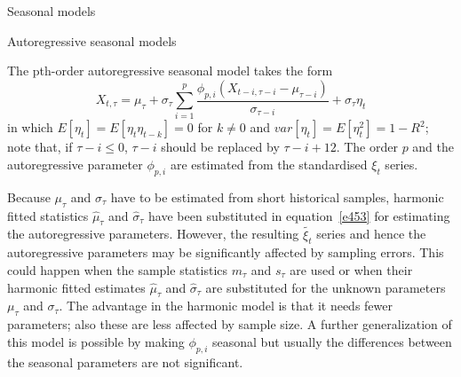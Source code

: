 \documentclass[8pt]{beamer}
\renewcommand{\emph}[1]{\textcolor{myorange}{#1}}
\begin{document}
\begin{frame}{Seasonal models}
    \begin{block}{Autoregressive seasonal models}
    \end{block}
    The pth-order autoregressive seasonal model takes the form
\begin{equation}
    X_{t,\tau} = \mu_{\tau} + \sigma_{\tau} \sum_{i=1}^p \frac{\phi_{p,i} (X_{t-i,\tau-i} - \mu_{\tau-i})}{\sigma_{\tau-i}} + \sigma_{\tau} \eta_t
        \label{e453}
    \end{equation}
    in which $E[\eta_t] = E[\eta_t \eta_{t-k}] = 0$ for $k\neq0$ and $var[\eta_t] = E[\eta_t^2] = 1-R^2$; note that, if $\tau -i \leq 0$, $\tau-i$ should be replaced by $\tau-i +12$. The order $p$ and the \emph{autoregressive parameter} $\phi_{p,i}$ are estimated from the standardised $\xi_t$ series. 

    Because $\mu_{\tau}$ and $\sigma_{\tau}$ have to be estimated from short historical samples, \emph{harmonic fitted statistics} $\hat{\mu}_{\tau}$ and $\hat{\sigma}_{\tau}$ have been substituted in equation~\ref{e453} for estimating the \emph{autoregressive parameters}. However, the resulting $\tilde{\xi_t}$ series and hence the \emph{autoregressive parameters} may be significantly affected by sampling errors. This could happen when the \emph{sample statistics} $m_{\tau}$ and $s_{\tau}$ are used or when their \emph{harmonic fitted estimates} $\hat{\mu}_{\tau}$ and $\hat{\sigma}_{\tau}$ are substituted  for the unknown parameters $\mu_{\tau}$ and $\sigma_{\tau}$. The advantage in the \emph{harmonic model} is that it needs fewer parameters; also these are less affected by sample size. A further generalization of this model is possible by making $\phi_{p,i}$ seasonal but usually the differences between the seasonal  parameters are not significant. 
\end{frame}
\end{document}
